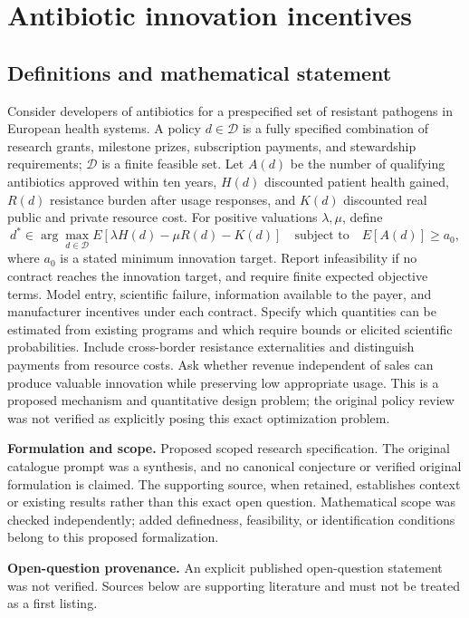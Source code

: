 \documentclass[11pt]{article}
\begin{document}
\section*{Antibiotic innovation incentives}\label{30007728}
\subsection{Definitions and mathematical statement}
Consider developers of antibiotics for a prespecified set of resistant pathogens in European health systems. A policy \(d\in\mathcal D\) is a fully specified combination of research grants, milestone prizes, subscription payments, and stewardship requirements; \(\mathcal D\) is a finite feasible set. Let \(A(d)\) be the number of qualifying antibiotics approved within ten years, \(H(d)\) discounted patient health gained, \(R(d)\) resistance burden after usage responses, and \(K(d)\) discounted real public and private resource cost. For positive valuations \(\lambda,\mu\), define
\[d^*\in\arg\max_{d\in\mathcal D}E[\lambda H(d)-\mu R(d)-K(d)]\quad\text{subject to}\quad E[A(d)]\geq a_0,\]
where \(a_0\) is a stated minimum innovation target. Report infeasibility if no contract reaches the innovation target, and require finite expected objective terms. Model entry, scientific failure, information available to the payer, and manufacturer incentives under each contract. Specify which quantities can be estimated from existing programs and which require bounds or elicited scientific probabilities. Include cross-border resistance externalities and distinguish payments from resource costs. Ask whether revenue independent of sales can produce valuable innovation while preserving low appropriate usage. This is a proposed mechanism and quantitative design problem; the original policy review was not verified as explicitly posing this exact optimization problem.

\par\textbf{Formulation and scope.} Proposed scoped research specification. The original catalogue prompt was a synthesis, and no canonical conjecture or verified original formulation is claimed. The supporting source, when retained, establishes context or existing results rather than this exact open question. Mathematical scope was checked independently; added definedness, feasibility, or identification conditions belong to this proposed formalization.

\par\textbf{Open-question provenance.} An explicit published open-question statement was not verified. Sources below are supporting literature and must not be treated as a first listing.
\end{document}
